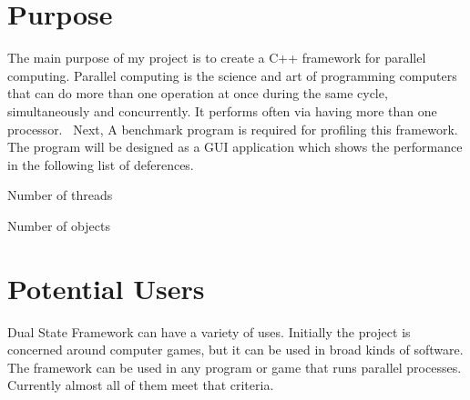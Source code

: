 \hypertarget{_introduction_IntroductionPurpose}{}\section{Purpose}\label{_introduction_IntroductionPurpose}
The main purpose of my project is to create a C++ framework for parallel computing. Parallel computing is the science and art of programming computers that can do more than one operation at once during the same cycle, simultaneously and concurrently. It performs often via having more than one processor.~\newline
 Next, A benchmark program is required for profiling this framework. The program will be designed as a G\+U\+I application which shows the performance in the following list of deferences.
\begin{DoxyItemize}
\item Number of threads
\item Number of objects
\end{DoxyItemize}\hypertarget{_introduction_IntroductionPotentialUsers}{}\section{Potential Users}\label{_introduction_IntroductionPotentialUsers}
Dual State Framework can have a variety of uses. Initially the project is concerned around computer games, but it can be used in broad kinds of software. The framework can be used in any program or game that runs parallel processes. Currently almost all of them meet that criteria. 